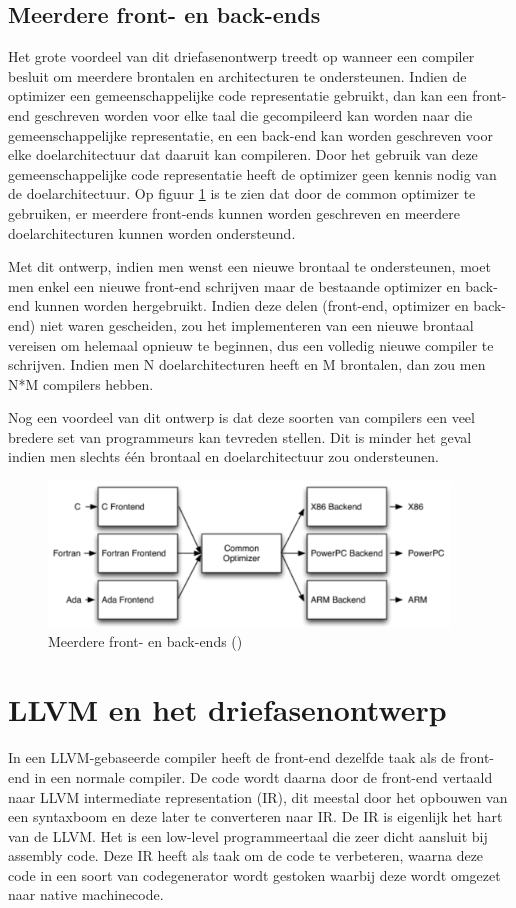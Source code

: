 \subsection{Meerdere front- en back-ends}
Het grote voordeel van dit driefasenontwerp treedt op wanneer een compiler besluit om meerdere brontalen en architecturen te ondersteunen. Indien de optimizer een gemeenschappelijke code representatie gebruikt, dan kan een front-end geschreven worden voor elke taal die gecompileerd kan worden naar die gemeenschappelijke representatie, en een back-end kan worden geschreven voor elke doelarchitectuur dat daaruit kan compileren. Door het gebruik van deze gemeenschappelijke code representatie heeft de optimizer geen kennis nodig van de doelarchitectuur. Op figuur \ref{fig:llvmdriefasen} is te zien dat door de common optimizer te gebruiken, er meerdere front-ends kunnen worden geschreven en meerdere doelarchitecturen kunnen worden ondersteund.

Met dit ontwerp, indien men wenst een nieuwe brontaal te ondersteunen, moet men enkel een nieuwe front-end schrijven maar de bestaande optimizer en back-end kunnen worden hergebruikt. Indien deze delen (front-end, optimizer en back-end) niet waren gescheiden, zou het implementeren van een nieuwe brontaal vereisen om helemaal opnieuw te beginnen, dus een volledig nieuwe compiler te schrijven. Indien men N doelarchitecturen heeft en M brontalen, dan zou men N*M compilers hebben.

Nog een voordeel van dit ontwerp is dat deze soorten van compilers een veel bredere set van programmeurs kan tevreden stellen. Dit is minder het geval indien men slechts één brontaal en doelarchitectuur zou ondersteunen. 

\begin{figure} [ht]
	\centering
	\includegraphics[width=0.95\textwidth]{img/llvmdriefasen}
	\caption{Meerdere front- en back-ends (\cite{aosa})}
	\label{fig:llvmdriefasen}
\end{figure}

\section{LLVM en het driefasenontwerp}
\label{sec:difference-llvm}
In een LLVM-gebaseerde compiler heeft de front-end dezelfde taak als de front-end in een normale compiler. De code wordt daarna door de front-end vertaald naar LLVM intermediate representation (IR), dit meestal door het opbouwen van een syntaxboom en deze later te converteren naar IR. De IR is eigenlijk het hart van de LLVM. Het is een low-level programmeertaal die zeer dicht aansluit bij assembly code. Deze IR heeft als taak om de code te verbeteren, waarna deze code in een soort van codegenerator wordt gestoken waarbij deze wordt omgezet naar native machinecode. 

